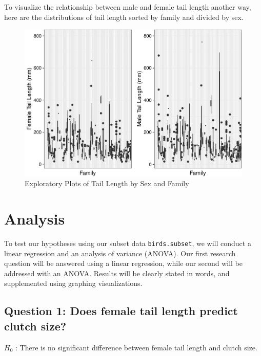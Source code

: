 \documentclass[
  12pt,
]{article}
\begin{document}
\newpage

To visualize the relationship between male and female tail length
another way, here are the distributions of tail length sorted by family
and divided by sex.

\begin{figure}
\centering
\includegraphics{Project_Code_files/figure-latex/r exploratory_plots_1-1.pdf}
\caption{Exploratory Plots of Tail Length by Sex and Family}
\end{figure}

\newpage

\hypertarget{analysis}{%
\section{Analysis}\label{analysis}}

To test our hypotheses using our subset data \texttt{birds.subset}, we
will conduct a linear regression and an analysis of variance (ANOVA).
Our first research question will be answered using a linear regression,
while our second will be addressed with an ANOVA. Results will be
clearly stated in words, and supplemented using graphing visualizations.

\hypertarget{question-1-does-female-tail-length-predict-clutch-size}{%
\subsection{Question 1: Does female tail length predict clutch
size?}\label{question-1-does-female-tail-length-predict-clutch-size}}

\(H_0\) : There is no significant difference between female tail length
and clutch size.
\end{document}
